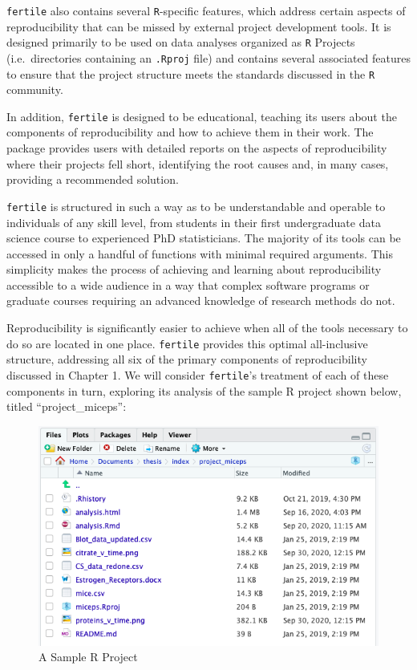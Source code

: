 \documentclass[12pt,twoside]{reedthesis}
\begin{document}
\texttt{fertile} also contains several \texttt{R}-specific features,
which address certain aspects of reproducibility that can be missed by
external project development tools. It is designed primarily to be used
on data analyses organized as \texttt{R} Projects (i.e.~directories
containing an \texttt{.Rproj} file) and contains several associated
features to ensure that the project structure meets the standards
discussed in the \texttt{R} community.

In addition, \texttt{fertile} is designed to be educational, teaching
its users about the components of reproducibility and how to achieve
them in their work. The package provides users with detailed reports on
the aspects of reproducibility where their projects fell short,
identifying the root causes and, in many cases, providing a recommended
solution.

\texttt{fertile} is structured in such a way as to be understandable and
operable to individuals of any skill level, from students in their first
undergraduate data science course to experienced PhD statisticians. The
majority of its tools can be accessed in only a handful of functions
with minimal required arguments. This simplicity makes the process of
achieving and learning about reproducibility accessible to a wide
audience in a way that complex software programs or graduate courses
requiring an advanced knowledge of research methods do not.

Reproducibility is significantly easier to achieve when all of the tools
necessary to do so are located in one place. \texttt{fertile} provides
this optimal all-inclusive structure, addressing all six of the primary
components of reproducibility discussed in Chapter 1. We will consider
\texttt{fertile}'s treatment of each of these components in turn,
exploring its analysis of the sample R project shown below, titled
``project\_miceps'':
\begin{figure}
\includegraphics[width=1\linewidth]{figure/sample-project} \caption{A Sample R Project}\label{fig:unnamed-chunk-9}
\end{figure}
\end{document}
